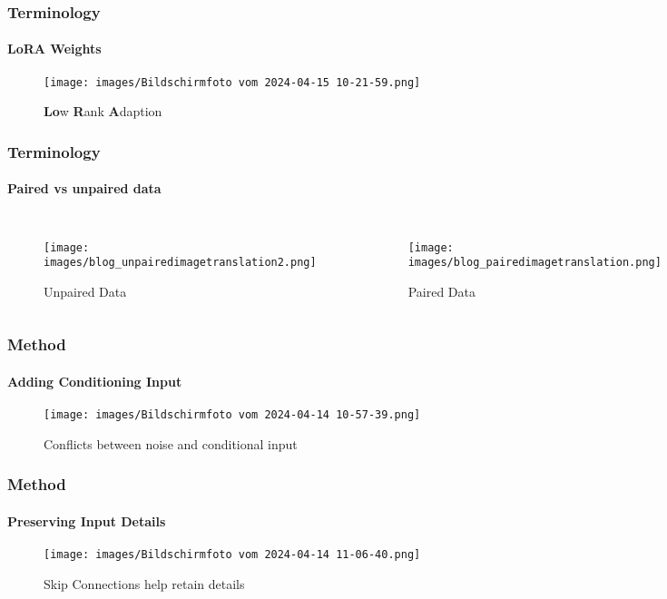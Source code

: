 \documentclass[aspectratio=169, lecture, amberg]{OTHAWbeamer}
\begin{document}
\begin{frame}
    \frametitle{Terminology}
    \framesubtitle{LoRA Weights}
    \begin{figure}
        \centering
        \texttt{[image: images/Bildschirmfoto vom 2024-04-15 10-21-59.png]}
        \caption{\textbf{Lo}w \textbf{R}ank \textbf{A}daption}
    \end{figure}
\end{frame}

\begin{frame}
\frametitle{Terminology}
\framesubtitle{Paired vs unpaired data}
\begin{columns}
    \centering    
    \begin{figure}
        \texttt{[image: images/blog\_unpairedimagetranslation2.png]}
        \caption{Unpaired Data}
    \end{figure}

    \centering    
    \begin{figure}        
        \texttt{[image: images/blog\_pairedimagetranslation.png]}
        \caption{Paired Data}
    \end{figure}
  \end{columns}
\end{frame}
\begin{frame}
\frametitle{Method}
\framesubtitle{Adding Conditioning Input}
\begin{figure}
    \centering
    \texttt{[image: images/Bildschirmfoto vom 2024-04-14 10-57-39.png]}
    \caption{Conflicts between noise and conditional input}
\end{figure}
\end{frame}

\begin{frame}
\frametitle{Method}
\framesubtitle{Preserving Input Details}
\begin{figure}
    \centering
    \texttt{[image: images/Bildschirmfoto vom 2024-04-14 11-06-40.png]}
    \caption{Skip Connections help retain details}
\end{figure}
\end{frame}
\end{document}
